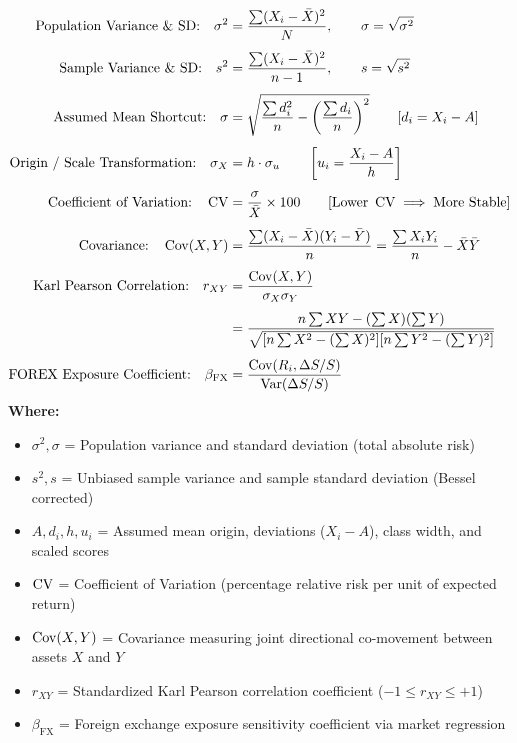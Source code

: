 \newpage
\begin{formulabox}
\begin{align*}
    \text{Population Variance \& SD:} \quad \sigma^2 &= \frac{\sum (X_i - \bar{X})^2}{N}, \qquad \sigma = \sqrt{\sigma^2} \\[4pt]
    \text{Sample Variance \& SD:} \quad s^2 &= \frac{\sum (X_i - \bar{X})^2}{n - 1}, \qquad s = \sqrt{s^2} \\[4pt]
    \text{Assumed Mean Shortcut:} \quad \sigma &= \sqrt{\frac{\sum d_i^2}{n} - \left(\frac{\sum d_i}{n}\right)^2} \qquad [d_i = X_i - A] \\[4pt]
    \text{Origin / Scale Transformation:} \quad \sigma_X &= h \cdot \sigma_u \qquad \left[u_i = \frac{X_i - A}{h}\right] \\[4pt]
    \text{Coefficient of Variation:} \quad \operatorname{CV} &= \frac{\sigma}{\bar{X}} \times 100 \qquad [\text{Lower } \operatorname{CV} \implies \text{More Stable}] \\[4pt]
    \text{Covariance:} \quad \operatorname{Cov}(X, Y) &= \frac{\sum (X_i - \bar{X})(Y_i - \bar{Y})}{n} = \frac{\sum X_i Y_i}{n} - \bar{X}\bar{Y} \\[4pt]
    \text{Karl Pearson Correlation:} \quad r_{XY} &= \frac{\operatorname{Cov}(X, Y)}{\sigma_X \sigma_Y} \\[4pt]
        &= \frac{n\sum XY - (\sum X)(\sum Y)}{\sqrt{[n\sum X^2 - (\sum X)^2][n\sum Y^2 - (\sum Y)^2]}} \\[4pt]
    \text{FOREX Exposure Coefficient:} \quad \beta_{\text{FX}} &= \frac{\operatorname{Cov}(R_i, \Delta S/S)}{\operatorname{Var}(\Delta S/S)}
\end{align*}
\textbf{Where:}
\begin{itemize}[noitemsep, topsep=2pt]
    \item $\sigma^2, \sigma$ = Population variance and standard deviation (total absolute risk)
    \item $s^2, s$ = Unbiased sample variance and sample standard deviation (Bessel corrected)
    \item $A, d_i, h, u_i$ = Assumed mean origin, deviations ($X_i - A$), class width, and scaled scores
    \item $\operatorname{CV}$ = Coefficient of Variation (percentage relative risk per unit of expected return)
    \item $\operatorname{Cov}(X, Y)$ = Covariance measuring joint directional co-movement between assets $X$ and $Y$
    \item $r_{XY}$ = Standardized Karl Pearson correlation coefficient ($-1 \le r_{XY} \le +1$)
    \item $\beta_{\text{FX}}$ = Foreign exchange exposure sensitivity coefficient via market regression
\end{itemize}
\end{formulabox}

